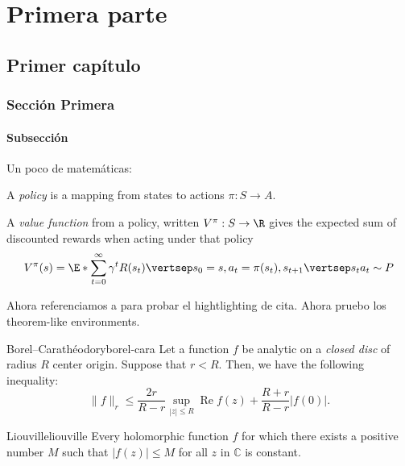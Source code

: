 \part{Primera parte}
\chapter{Primer capítulo}

\section{Sección Primera}
\lipsum[1-2]

\subsection{Subsección}
Un poco de matemáticas:

A \emph{policy} is a mapping from states to actions $\pi: S \to A$.

A \emph{value function} from a policy, written $V^{\pi}: S \to \R$ gives the expected sum 
of discounted rewards when acting under that policy
\begin{equation}
	V^{\pi} (s) = \E*{\sum_{t=0}^{\infty} \gamma^t R(s_t) \vertsep s_0 =s, a_t 
	= \pi(s_t), s_{t+1} \vertsep s_t a_t \sim P}
\end{equation}

Ahora referenciamos a \cite{ths:RodZ} para probar el hightlighting de cita. Ahora pruebo 
los theorem-like environments.

\begin{thrm}{Borel--Carathéodory}{borel-cara}
Let a function $f$ be analytic on a \emph{closed disc} of radius $R$ center origin.
Suppose that $r < R$. Then, we have the following inequality:
\begin{equation}
\|f\|_r \le \frac{2r}{R-r} \sup_{|z| \le R} \operatorname{Re} f(z) + \frac{R+r}{R-r} 
|f(0)|.
\end{equation}
\end{thrm}

\lipsum[2][2]

\begin{thrm}{Liouville}{liouville}
	Every holomorphic function $f$ for which there exists a positive 
	number $M$ such that $|f(z)| \leq M$ for all $z$ in $\mathbb{C}$
	is constant.
\end{thrm}


